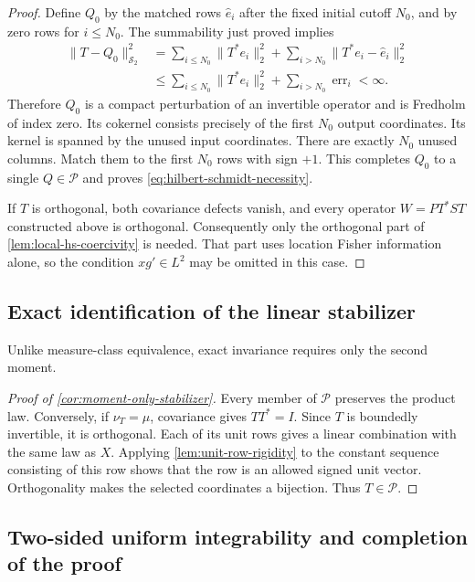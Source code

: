 \begin{proof}
Define $Q_0$ by the matched rows $\widehat e_i$ after the fixed initial cutoff
$N_0$, and by zero rows for $i\leq N_0$.
The summability just proved implies
\[
 \begin{aligned}
 \|T-Q_0\|_{\mathcal S_2}^2
 &=\sum_{i\leq N_0}\|T^*e_i\|_2^2
                      +\sum_{i>N_0}\|T^*e_i-\widehat e_i\|_2^2\\
 &\leq\sum_{i\leq N_0}\|T^*e_i\|_2^2
       +\sum_{i>N_0}\operatorname{err}_i<\infty.
 \end{aligned}
 \]
Therefore $Q_0$ is a compact perturbation of an invertible operator and is
Fredholm of index zero.
Its cokernel consists precisely of the first $N_0$ output coordinates.
Its kernel is spanned by the unused input coordinates.
There are exactly $N_0$ unused columns.
Match them to the first $N_0$ rows with sign $+1$.
This completes $Q_0$ to a single $Q\in\mathcal P$ and proves
\eqref{eq:hilbert-schmidt-necessity}.

If $T$ is orthogonal, both covariance defects vanish, and every
operator $W=P T^*ST$ constructed above is orthogonal.
Consequently only the orthogonal part of
\cref{lem:local-hs-coercivity} is needed.  That part uses location
Fisher information alone, so the condition $xg'\in L^2$ may be
omitted in this case.
\end{proof}

\subsection{Exact identification of the linear stabilizer}
\label{sec:exact-stabilizer}

Unlike measure-class equivalence, exact invariance requires only the second
moment.

\begin{proof}[Proof of \cref{cor:moment-only-stabilizer}]
Every member of $\mathcal P$ preserves the product law.
Conversely, if $\nu_T=\mu$, covariance gives $TT^*=I$.
Since $T$ is boundedly invertible, it is orthogonal.  Each of its unit
rows gives a linear combination with the same law as $X$.
Applying \cref{lem:unit-row-rigidity} to the constant sequence
consisting of this row shows that the row is an allowed signed unit
vector.  Orthogonality makes the selected coordinates a bijection.
Thus $T\in\mathcal P$.
\end{proof}
\subsection{Two-sided uniform integrability and completion of the proof}
\label{sec:likelihood-convergence}

